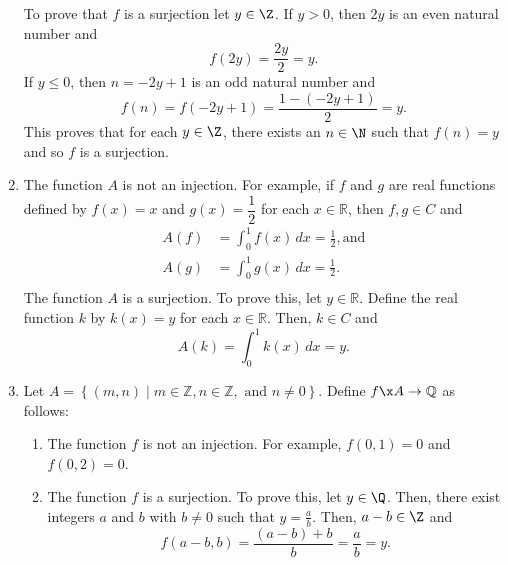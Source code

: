 \begin{enumerate}
\noindent
To prove that $f$ is a surjection let $y \in \Z$.  If $y > 0$, then $2y$ is an even natural number and
\[
f(2y) = \frac{2y}{2} = y.
\]
If $y \leq 0$, then $n = -2y + 1$ is an odd natural number and 
\[
f(n) = f(-2y + 1) = \frac{1 - (-2y + 1)}{2} = y.
\]
This proves that for each $y \in \Z$, there exists an $n \in \N$ such that $f(n) = y$ and so $f$ is a surjection.




\item The function $A$ is not an injection.  For example, if $f$ and $g$ are real functions defined by $f ( x ) = x$ and $g ( x ) = \dfrac{1}{2}$ for each 
$x \in \mathbb{R}$, then $f, g \in C$ and
\[
\begin{aligned}
A ( f ) &= \int_0^1 {f( x ) \, dx} = \frac{1}{2}, \text{and} \\
A ( g ) &= \int_0^1 {g( x ) \, dx} = \frac{1}{2}. \\
\end{aligned}
\]
The function $A$ is a surjection.  To prove this, let $y \in \mathbb{R}$.  Define the real function $k$ by $k ( x ) = y$ for each $x \in \mathbb{R}$.  Then, $k \in C$ and 
\[
A ( k ) = \int_0^1 {k( x ) \, dx} = y.
\]


\item Let $A = \left\{ ( m, n ) \mid m \in \mathbb{Z}, n \in \mathbb{Z}, \text{ and } n \ne 0 \right\}$.  Define $f\x A \to \mathbb{Q}$ as follows:

\begin{enumerate}
\item The function $f$ is not an injection.  For example, $f(0, 1) = 0$ and $f(0, 2) = 0$.  

\item The function $f$ is a surjection.  To prove this, let $y \in \Q$.  Then, there exist integers $a$ and $b$ with $b \ne 0$ such that $y = \frac{a}{b}$.  Then, $a - b \in \Z$ and
\[
f(a - b, b) = \frac{(a - b) + b}{b} = \frac{a}{b} = y.
\]
\end{enumerate}
\end{enumerate}

